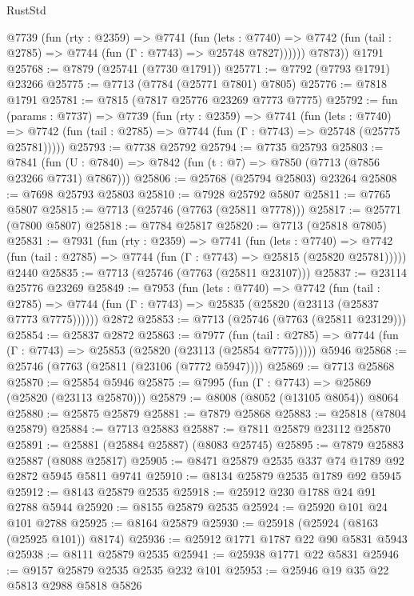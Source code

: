 \begin{lexlean}{RustStd}
\begin{coremodule}
          @7739
            (fun (rty : @2359) =>
            @7741
              (fun (lets : @7740) =>
              @7742 (fun (tail : @2785) => @7744 (fun (Γ : @7743) => @25748 @7827))))))
        @7873))
    @1791
@25768 := @7879 (@25741 (@7730 @1791))
@25771 := @7792 (@7793 @1791) @23266
@25775 := @7713 (@7784 (@25771 @7801) @7805)
@25776 := @7818 @1791
@25781 := @7815 (@7817 @25776 @23269 @7773 @7775)
@25792 := fun (params : @7737) =>
  @7739
    (fun (rty : @2359) =>
    @7741
      (fun (lets : @7740) =>
      @7742 (fun (tail : @2785) => @7744 (fun (Γ : @7743) => @25748 (@25775 @25781)))))
@25793 := @7738 @25792
@25794 := @7735 @25793
@25803 := @7841
    (fun (U : @7840) => @7842 (fun (t : @7) => @7850 (@7713 (@7856 @23266 @7731) @7867)))
@25806 := @25768 (@25794 @25803) @23264
@25808 := @7698 @25793 @25803
@25810 := @7928 @25792 @5807
@25811 := @7765 @5807
@25815 := @7713 (@25746 (@7763 (@25811 @7778)))
@25817 := @25771 (@7800 @5807)
@25818 := @7784 @25817
@25820 := @7713 (@25818 @7805)
@25831 := @7931
    (fun (rty : @2359) =>
    @7741
      (fun (lets : @7740) =>
      @7742 (fun (tail : @2785) => @7744 (fun (Γ : @7743) => @25815 (@25820 @25781)))))
    @2440
@25835 := @7713 (@25746 (@7763 (@25811 @23107)))
@25837 := @23114 @25776 @23269
@25849 := @7953
    (fun (lets : @7740) =>
    @7742
      (fun (tail : @2785) =>
      @7744 (fun (Γ : @7743) => @25835 (@25820 (@23113 (@25837 @7773 @7775))))))
    @2872
@25853 := @7713 (@25746 (@7763 (@25811 @23129)))
@25854 := @25837 @2872
@25863 := @7977
    (fun (tail : @2785) => @7744 (fun (Γ : @7743) => @25853 (@25820 (@23113 (@25854 @7775)))))
    @5946
@25868 := @25746 (@7763 (@25811 (@23106 (@7772 @5947))))
@25869 := @7713 @25868
@25870 := @25854 @5946
@25875 := @7995 (fun (Γ : @7743) => @25869 (@25820 (@23113 @25870)))
@25879 := @8008 (@8052 (@13105 @8054)) @8064
@25880 := @25875 @25879
@25881 := @7879 @25868
@25883 := @25818 (@7804 @25879)
@25884 := @7713 @25883
@25887 := @7811 @25879 @23112 @25870
@25891 := @25881 (@25884 @25887) (@8083 @25745)
@25895 := @7879 @25883 @25887 (@8088 @25817)
@25905 := @8471 @25879 @2535 @337 @74 @1789 @92 @2872 @5945 @5811 @9741
@25910 := @8134 @25879 @2535 @1789 @92 @5945
@25912 := @8143 @25879 @2535
@25918 := @25912 @230 @1788 @24 @91 @2788 @5944
@25920 := @8155 @25879 @2535
@25924 := @25920 @101 @24 @101 @2788
@25925 := @8164 @25879
@25930 := @25918 (@25924 (@8163 (@25925 @101)) @8174)
@25936 := @25912 @1771 @1787 @22 @90 @5831 @5943
@25938 := @8111 @25879 @2535
@25941 := @25938 @1771 @22 @5831
@25946 := @9157 @25879 @2535 @2535 @232 @101
@25953 := @25946 @19 @35 @22 @5813 @2988 @5818 @5826

\end{coremodule}
\end{lexlean}
